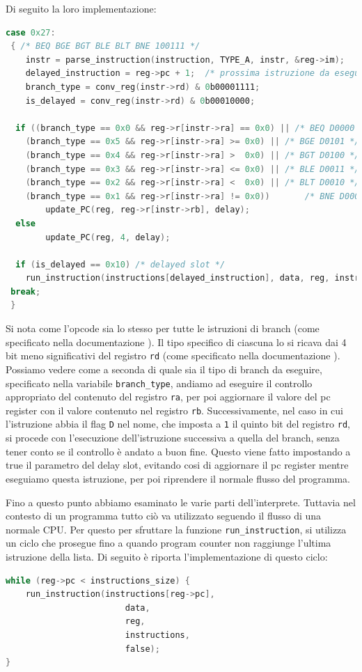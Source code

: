 Di seguito la loro implementazione:
\begin{lstlisting}[language=C,label={branch},caption={Istruzioni Branch}]
 case 0x27:
 { /* BEQ BGE BGT BLE BLT BNE 100111 */
    instr = parse_instruction(instruction, TYPE_A, instr, &reg->im);
    delayed_instruction = reg->pc + 1;  /* prossima istruzione da eseguire in caso di delay*/
    branch_type = conv_reg(instr->rd) & 0b00001111;
    is_delayed = conv_reg(instr->rd) & 0b00010000;

  if ((branch_type == 0x0 && reg->r[instr->ra] == 0x0) || /* BEQ D0000 */
    (branch_type == 0x5 && reg->r[instr->ra] >= 0x0) || /* BGE D0101 */
    (branch_type == 0x4 && reg->r[instr->ra] >  0x0) ||	/* BGT D0100 */
    (branch_type == 0x3 && reg->r[instr->ra] <= 0x0) || /* BLE D0011 */
    (branch_type == 0x2 && reg->r[instr->ra] <  0x0) ||	/* BLT D0010 */
    (branch_type == 0x1 && reg->r[instr->ra] != 0x0))		/* BNE D0001 */
        update_PC(reg, reg->r[instr->rb], delay);
  else
        update_PC(reg, 4, delay);

  if (is_delayed == 0x10) /* delayed slot */
    run_instruction(instructions[delayed_instruction], data, reg, instructions, true);
 break;
 }
\end{lstlisting}
Si nota come l'opcode sia lo stesso per tutte le istruzioni di branch (come specificato nella documentazione \cite{sitoMicroblaze}). Il tipo specifico di ciascuna lo si ricava dai 4 bit meno significativi del registro \texttt{rd} (come specificato nella documentazione \cite{sitoMicroblaze}).
Possiamo vedere come a seconda di quale sia il tipo di branch da eseguire, specificato nella variabile \texttt{branch\_type}, andiamo ad eseguire il controllo appropriato del contenuto del registro \texttt{ra}, per poi aggiornare il valore del pc register con il valore contenuto nel registro \texttt{rb}.
Successivamente, nel caso in cui l'istruzione abbia il flag \texttt{D} nel nome, che imposta a \texttt{1} il quinto bit del registro \texttt{rd}, si procede con l'esecuzione dell'istruzione successiva a quella del branch, senza tener conto se il controllo è andato a buon fine. Questo viene fatto impostando a true il parametro del delay slot, evitando cosi di aggiornare il pc register mentre eseguiamo questa istruzione, per poi riprendere il normale flusso del programma.

\vspace{0.5cm}

\noindent Fino a questo punto abbiamo esaminato le varie parti dell'interprete. Tuttavia nel contesto di un programma tutto ciò va utilizzato seguendo il flusso di una normale CPU. Per questo per sfruttare la funzione \texttt{run\_instruction}, si utilizza un ciclo che prosegue fino a quando program counter non raggiunge l'ultima istruzione della lista.
Di seguito è riporta l'implementazione di questo ciclo:
\begin{lstlisting}[language=C,caption={Ciclo Interprete},label={ciclointerprete}]
while (reg->pc < instructions_size) { 
    run_instruction(instructions[reg->pc], 
                        data, 
                        reg, 
                        instructions, 
                        false);
}
\end{lstlisting}

